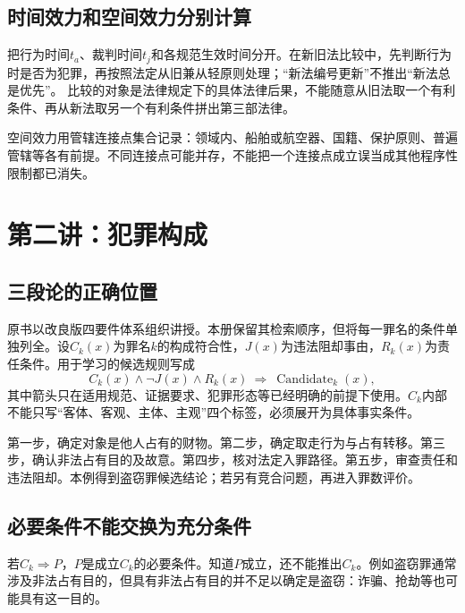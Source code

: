 \subsection{时间效力和空间效力分别计算}
把行为时间$t_a$、裁判时间$t_j$和各规范生效时间分开。在新旧法比较中，先判断行为时是否为犯罪，再按照法定从旧兼从轻原则处理；“新法编号更新”不推出“新法总是优先”。 比较的对象是法律规定下的具体法律后果，不能随意从旧法取一个有利条件、再从新法取另一个有利条件拼出第三部法律。

空间效力用管辖连接点集合记录：领域内、船舶或航空器、国籍、保护原则、普遍管辖等各有前提。不同连接点可能并存，不能把一个连接点成立误当成其他程序性限制都已消失。


\section{第二讲：犯罪构成}
\subsection{三段论的正确位置}
原书以改良版四要件体系组织讲授。本册保留其检索顺序，但将每一罪名的条件单独列全。设$C_k(x)$为罪名$k$的构成符合性，$J(x)$为违法阻却事由，$R_k(x)$为责任条件。用于学习的候选规则写成
\[
 C_k(x)\wedge\neg J(x)\wedge R_k(x)
 \ \Longrightarrow\ \operatorname{Candidate}_k(x),
\]
其中箭头只在适用规范、证据要求、犯罪形态等已经明确的前提下使用。$C_k$内部不能只写“客体、客观、主体、主观”四个标签，必须展开为具体事实条件。

第一步，确定对象是他人占有的财物。第二步，确定取走行为与占有转移。第三步，确认非法占有目的及故意。第四步，核对法定入罪路径。第五步，审查责任和违法阻却。本例得到盗窃罪候选结论；若另有竞合问题，再进入罪数评价。

\subsection{必要条件不能交换为充分条件}
若$C_k\Rightarrow P$，$P$是成立$C_k$的必要条件。知道$P$成立，还不能推出$C_k$。例如盗窃罪通常涉及非法占有目的，但具有非法占有目的并不足以确定是盗窃：诈骗、抢劫等也可能具有这一目的。

